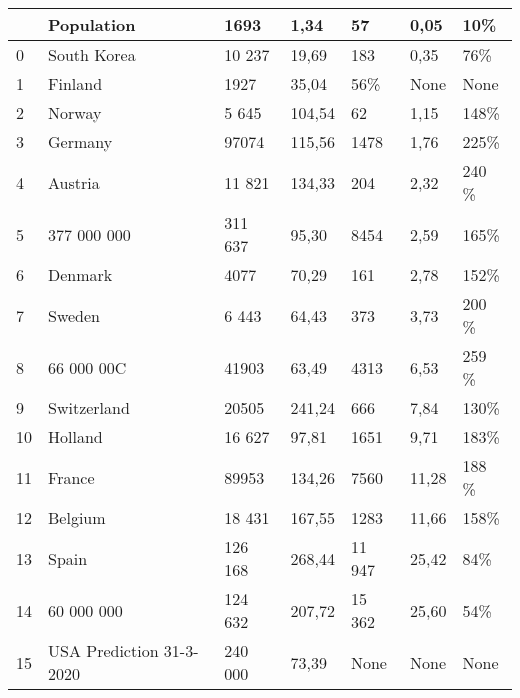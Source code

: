 \begin{tabular}{lllllll}
\toprule
{} &                Population &     1693 &    1,34 &      57 &   0,05 &    10\% \\
\midrule
0  &               South Korea &   10 237 &   19,69 &     183 &   0,35 &    76\% \\
1  &                   Finland &     1927 &   35,04 &     56\% &   None &   None \\
2  &                    Norway &    5 645 &  104,54 &      62 &   1,15 &   148\% \\
3  &                   Germany &    97074 &  115,56 &    1478 &   1,76 &   225\% \\
4  &                   Austria &   11 821 &  134,33 &     204 &   2,32 &  240 \% \\
5  &               377 000 000 &  311 637 &   95,30 &    8454 &   2,59 &   165\% \\
6  &                   Denmark &     4077 &   70,29 &     161 &   2,78 &   152\% \\
7  &                    Sweden &    6 443 &   64,43 &     373 &   3,73 &  200 \% \\
8  &                66 000 00C &    41903 &   63,49 &    4313 &   6,53 &  259 \% \\
9  &               Switzerland &    20505 &  241,24 &     666 &   7,84 &   130\% \\
10 &                   Holland &   16 627 &   97,81 &    1651 &   9,71 &   183\% \\
11 &                    France &    89953 &  134,26 &    7560 &  11,28 &  188 \% \\
12 &                   Belgium &   18 431 &  167,55 &    1283 &  11,66 &   158\% \\
13 &                     Spain &  126 168 &  268,44 &  11 947 &  25,42 &    84\% \\
14 &                60 000 000 &  124 632 &  207,72 &  15 362 &  25,60 &    54\% \\
15 &  USA Prediction 31-3-2020 &  240 000 &   73,39 &    None &   None &   None \\
\bottomrule
\end{tabular}
